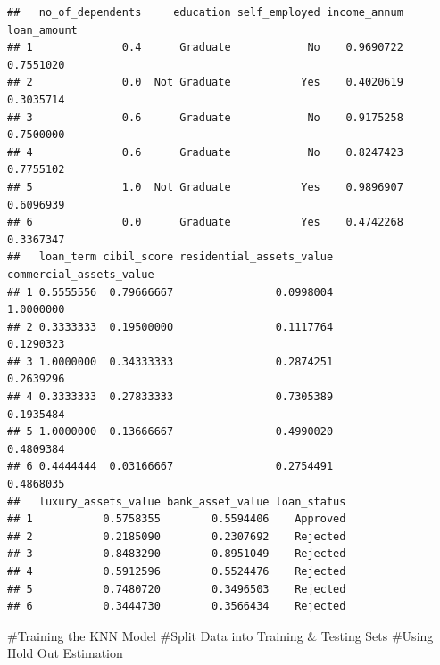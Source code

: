\documentclass[
]{article}
\newenvironment{Shaded}{\begin{snugshade}}{\end{snugshade}}
\newcommand{\AttributeTok}[1]{\textcolor[rgb]{0.13,0.29,0.53}{#1}}
\newcommand{\CommentTok}[1]{\textcolor[rgb]{0.56,0.35,0.01}{\textit{#1}}}
\newcommand{\ConstantTok}[1]{\textcolor[rgb]{0.56,0.35,0.01}{#1}}
\newcommand{\DecValTok}[1]{\textcolor[rgb]{0.00,0.00,0.81}{#1}}
\newcommand{\FloatTok}[1]{\textcolor[rgb]{0.00,0.00,0.81}{#1}}
\newcommand{\FunctionTok}[1]{\textcolor[rgb]{0.13,0.29,0.53}{\textbf{#1}}}
\newcommand{\NormalTok}[1]{#1}
\newcommand{\OtherTok}[1]{\textcolor[rgb]{0.56,0.35,0.01}{#1}}
\newcommand{\SpecialCharTok}[1]{\textcolor[rgb]{0.81,0.36,0.00}{\textbf{#1}}}
\begin{document}
\begin{verbatim}
##   no_of_dependents     education self_employed income_annum loan_amount
## 1              0.4      Graduate            No    0.9690722   0.7551020
## 2              0.0  Not Graduate           Yes    0.4020619   0.3035714
## 3              0.6      Graduate            No    0.9175258   0.7500000
## 4              0.6      Graduate            No    0.8247423   0.7755102
## 5              1.0  Not Graduate           Yes    0.9896907   0.6096939
## 6              0.0      Graduate           Yes    0.4742268   0.3367347
##   loan_term cibil_score residential_assets_value commercial_assets_value
## 1 0.5555556  0.79666667                0.0998004               1.0000000
## 2 0.3333333  0.19500000                0.1117764               0.1290323
## 3 1.0000000  0.34333333                0.2874251               0.2639296
## 4 0.3333333  0.27833333                0.7305389               0.1935484
## 5 1.0000000  0.13666667                0.4990020               0.4809384
## 6 0.4444444  0.03166667                0.2754491               0.4868035
##   luxury_assets_value bank_asset_value loan_status
## 1           0.5758355        0.5594406    Approved
## 2           0.2185090        0.2307692    Rejected
## 3           0.8483290        0.8951049    Rejected
## 4           0.5912596        0.5524476    Rejected
## 5           0.7480720        0.3496503    Rejected
## 6           0.3444730        0.3566434    Rejected
\end{verbatim}

\#Training the KNN Model \#Split Data into Training \& Testing Sets
\#Using Hold Out Estimation

\begin{Shaded}
\end{Shaded}
\end{document}
